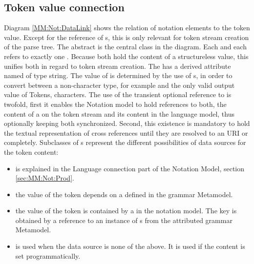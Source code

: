 \subsection{Token value connection} \label{ss:tokenValCon}
Diagram \ref{MM:Not:DataLink} shows the relation of notation elements to the token value. Except for the  reference of s, this is only relevant for token stream creation of the parse tree. The abstract  is the central class in the diagram. Each  and each  refers to exactly one . Because both hold the content of a structureless value, this unifies both in regard to token stream creation. The  has a derived attribute named  of type string. The value of  is determined by the use of s, in order to convert between a non-character type, for example  and the only valid output value of Tokens, characters. The use of the transient optional reference to  is twofold, first it enables the Notation model to hold references to both, the content of a  on the token stream and its content in the language model, thus optionally keeping both synchronized. Second, this existence is mandatory to hold the textual representation of cross references until they are resolved to an URI or completely. Subclasses of s represent the different possibilities of data sources for the token content:
\begin{itemize}
	\item {} is explained in the Language connection part of the Notation Model, section \ref{sec:MM:Not:Prod}.
	\item {} the value of the token depends on a   defined in the grammar Metamodel.
	\item {} the value of the token is contained by a  in the notation model. The key is obtained by a reference to an instance of s from the attributed grammar Metamodel.
	\item {} is used when the data source is none of the above. It is used if the content is set programmatically.
\end{itemize}


